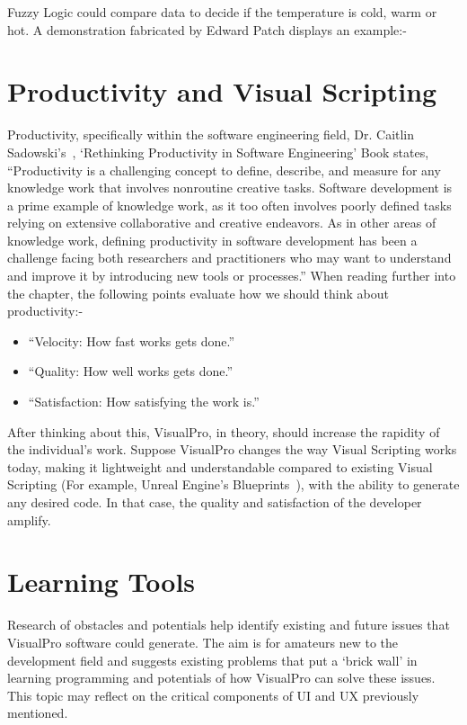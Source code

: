 \documentclass[12pt]{report} %
\begin{document}
		Fuzzy Logic could compare data to decide if the temperature is cold, warm or hot. A demonstration fabricated by Edward Patch displays an example:-

		
	\section{Productivity and Visual Scripting}
		Productivity, specifically within the software engineering field, Dr. Caitlin Sadowski's~\cite{dr_caitlin_sadowski_rethinking_2019}, `Rethinking Productivity in Software Engineering' Book states, ``Productivity is a challenging concept to define, describe, and measure for any knowledge work that involves nonroutine creative tasks. Software development is a prime example of knowledge work, as it too often involves poorly defined tasks relying on extensive collaborative and creative endeavors. As in other areas of knowledge work, defining productivity in software development has been a challenge facing both researchers and practitioners who may want to understand and improve it by introducing new tools or processes.'' When reading further into the chapter, the following points evaluate how we should think about productivity:-

		\begin{itemize}
		\item ``Velocity: How fast works gets done.''~\cite{dr_caitlin_sadowski_rethinking_2019}
		\item ``Quality: How well works gets done.''~\cite{dr_caitlin_sadowski_rethinking_2019}
		\item ``Satisfaction: How satisfying the work is.''~\cite{dr_caitlin_sadowski_rethinking_2019}
		\end{itemize}

		After thinking about this, VisualPro, in theory, should increase the rapidity of the individual's work. Suppose VisualPro changes the way Visual Scripting works today, making it lightweight and understandable compared to existing Visual Scripting (For example, Unreal Engine's Blueprints~\cite{unreal_engine_introduction_nodate}), with the ability to generate any desired code. In that case, the quality and satisfaction of the developer amplify.

	\section{Learning Tools}
		Research of obstacles and potentials help identify existing and future issues that VisualPro software could generate. The aim is for amateurs new to the development field and suggests existing problems that put a `brick wall' in learning programming and potentials of how VisualPro can solve these issues. This topic may reflect on the critical components of UI and UX previously mentioned.
\end{document}
